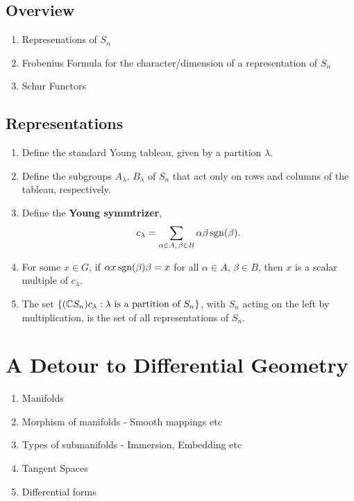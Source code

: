 \section{Overview}

\begin{enumerate}
    \makethislistcompact
    \item Represenations of $S_n$
    \item Frobenius Formula for the character/dimension of a representation of $S_n$
    \item Schur Functors
\end{enumerate}

\section{Representations}


\begin{enumerate}
    \makethislistcompact
    \item Define the standard Young tableau, given by a partition $\lambda$.
    \item Define the subgroups $A_\lambda,\, B_\lambda$ of $S_n$ that act only on rows and columns of the tableau, respectively.
    \item Define the \textbf{Young symmtrizer},
        \begin{align}
            c_\lambda = \sum_{\substack{\alpha\in A,\, \beta\in B}} \alpha \beta \operatorname{sgn}(\beta).
        \end{align}
    \item For some $x\in G$, if $\alpha x \operatorname{sgn}(\beta)\beta = x$ for all $\alpha\in A,\, \beta\in B$, then $x$ is a scalar multiple of $c_\lambda$.
    \item The set $\{(\mathbb{C} S_n )c_\lambda : \lambda \text{ is a partition of } S_n\}$, with $S_n$ acting on the left by multiplication, is the set of all representations of $S_n$.
\end{enumerate}


\chapter{A Detour to Differential Geometry}
\label{cha:a_small_detour_to_differential_geometry}

\begin{enumerate}
    \makethislistcompact
    \item Manifolds
    \item Morphism of manifolds -  Smooth mappings etc
    \item Types of submanifolds - Immersion, Embedding etc
    \item Tangent Spaces
    \item Differential forms
\end{enumerate}

